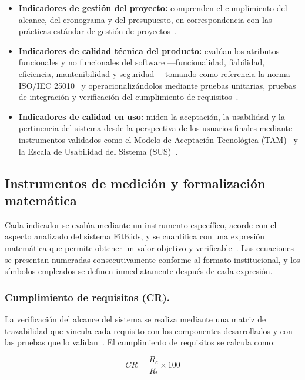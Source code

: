 				\begin{itemize}
					\item \textbf{Indicadores de gestión del proyecto:} comprenden el cumplimiento del alcance, del cronograma y del presupuesto, en correspondencia con las prácticas estándar de gestión de proyectos~\cite{Creswell2018}.
					\item \textbf{Indicadores de calidad técnica del producto:} evalúan los atributos funcionales y no funcionales del software ---funcionalidad, fiabilidad, eficiencia, mantenibilidad y seguridad--- tomando como referencia la norma ISO/IEC 25010~\cite{GuerreroUlloa2024} y operacionalizándolos mediante pruebas unitarias, pruebas de integración y verificación del cumplimiento de requisitos~\cite{Fowler2002}.
					\item \textbf{Indicadores de calidad en uso:} miden la aceptación, la usabilidad y la pertinencia del sistema desde la perspectiva de los usuarios finales mediante instrumentos validados como el Modelo de Aceptación Tecnológica (TAM)~\cite{Venkatesh2003} y la Escala de Usabilidad del Sistema (SUS)~\cite{Bangor2009}.
				\end{itemize}
				
			\subsection{Instrumentos de medición y formalización matemática}
				Cada indicador se evalúa mediante un instrumento específico, acorde con el aspecto analizado del sistema FitKids, y se cuantifica con una expresión matemática que permite obtener un valor objetivo y verificable~\cite{GuerreroUlloa2024}. Las ecuaciones se presentan numeradas consecutivamente conforme al formato institucional, y los símbolos empleados se definen inmediatamente después de cada expresión.
				
				\subsubsection{Cumplimiento de requisitos (CR).}
					La verificación del alcance del sistema se realiza mediante una matriz de trazabilidad que vincula cada requisito con los componentes desarrollados y con las pruebas que lo validan~\cite{Fowler2002}. El cumplimiento de requisitos se calcula como:
					
					\begin{equation}
						\label{ec:cr}
						CR = \frac{R_c}{R_t} \times 100
					\end{equation}
					
